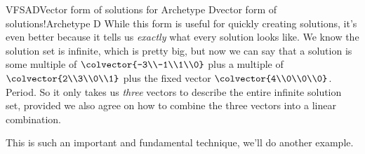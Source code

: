 \begin{example}{VFSAD}{Vector form of solutions for Archetype D}{vector form of solutions!Archetype D}
%
While this form is useful for quickly creating solutions, it's even better because it tells us {\em exactly} what every solution looks like.  We know the solution set is infinite, which is pretty big, but now we can say that a solution is some multiple of $\colvector{-3\\-1\\1\\0}$ plus a multiple of $\colvector{2\\3\\0\\1}$ plus the fixed vector $\colvector{4\\0\\0\\0}$.  Period.  So it only takes us {\em three} vectors to describe the entire infinite solution set, provided we also agree on how to combine the three vectors into a linear combination.
\end{example}
%
This is such an important and fundamental technique, we'll do another example.
%
